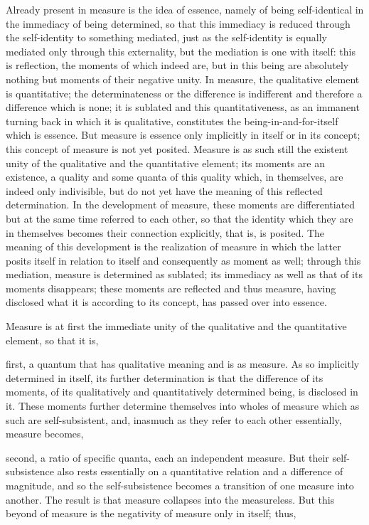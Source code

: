 Already present in measure is the idea of essence,
namely of being self-identical in the immediacy of being determined,
so that this immediacy is reduced through the self-identity to
something mediated, just as the self-identity is equally mediated
only through this externality, but the mediation is one with itself:
this is reflection, the moments of which indeed are,
but in this being are absolutely nothing but
moments of their negative unity.
In measure, the qualitative element is quantitative;
the determinateness or the difference is indifferent
and therefore a difference which is none;
it is sublated and this quantitativeness,
as an immanent turning back in which it is qualitative,
constitutes the being-in-and-for-itself which is essence.
But measure is essence only implicitly in itself or in its concept;
this concept of measure is not yet posited.
Measure is as such still the existent unity of the
qualitative and the quantitative element;
its moments are an existence, a quality and some quanta of this quality
which, in themselves, are indeed only indivisible,
but do not yet have the meaning of this reflected determination.
In the development of measure, these moments are differentiated
but at the same time referred to each other,
so that the identity which they are in themselves becomes
their connection explicitly, that is, is posited.
The meaning of this development is the realization of measure
in which the latter posits itself in relation to itself
and consequently as moment as well;
through this mediation, measure is determined as sublated;
its immediacy as well as that of its moments disappears;
these moments are reflected and thus measure,
having disclosed what it is according to its concept,
has passed over into essence.

Measure is at first the immediate unity of
the qualitative and the quantitative element, so that it is,

first, a quantum that has qualitative meaning and is as measure.
As so implicitly determined in itself, its further determination is that
the difference of its moments,
of its qualitatively and quantitatively determined being,
is disclosed in it.
These moments further determine themselves into
wholes of measure which as such are self-subsistent,
and, inasmuch as they refer to each other essentially,
measure becomes,

second, a ratio of specific quanta, each an independent measure.
But their self-subsistence also rests essentially
on a quantitative relation and a difference of magnitude,
and so the self-subsistence becomes a transition
of one measure into another.
The result is that measure collapses into the measureless.
But this beyond of measure is the negativity of measure
only in itself; thus,

